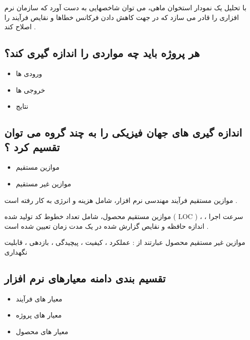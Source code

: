 \documentclass{article}
\begin{document}
با تحلیل یک نمودار استخوان ماهی، می توان شاخصهایی به دست آورد که سازمان نرم افزاری را قادر می سازد  که در جهت کاهش دادن فرکانس خطاها و نقایص فرآیند را اصلاح کند .







\subsection{هر پروژه باید چه مواردی را اندازه گیری کند؟}


\begin{itemize}
	\item ورودی ها
	\item خروجی ها
	\item نتایج
\end{itemize}



\subsection{اندازه گیری های جهان فیزیکی را به چند گروه می توان تقسیم کرد ؟}


\begin{itemize}
	\item موازین مستقیم
	\item موازین غیر مستقیم
\end{itemize}



موازین مستقیم فرآیند مهندسی نرم افزار، شامل هزینه و انرژی به کار رفته است .

موازین مستقیم محصول، شامل تعداد خطوط کد تولید شده ( LOC ) ، سرعت اجرا ، اندازه حافظه و نقایص گزارش شده در یک مدت زمان تعیین شده است .

موازین غیر مستقیم محصول عبارتند از : عملکرد ، کیفیت ، پیچیدگی ، بازدهی ، قابلیت نگهداری 



\subsection{تقسیم بندی دامنه معیارهای نرم افزار}

\begin{itemize}
	\item معیار های فرآیند
	\item معیار های پروژه
	\item معیار های محصول
\end{itemize}
\end{document}
